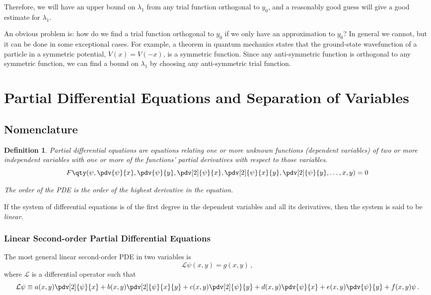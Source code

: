 \documentclass{article}
\theoremstyle{plain}\theoremheaderfont{\normalfont\itshape}\theorembodyfont{\rmfamily}\theoremseparator{.}\newtheorem*{rem}{Remark}\newtheorem*{ex}{Example}\newtheorem*{proof}{Proof}\newtheorem*{altp}{Alternative proof}
\theoremstyle{plain}\theoremheaderfont{\normalfont\bfseries}\theorembodyfont{\rmfamily}\theoremseparator{.}\newtheorem{thm}{Theorem}[section]\newtheorem{lem}[thm]{Lemma}\newtheorem{prop}[thm]{Proposition}\newtheorem*{cor}{Corollary}\newtheorem{defn}[thm]{Definition}\newtheorem{clm}[thm]{Claim}\newtheorem{clminproof}{Claim}
\theoremstyle{break}\theoremheaderfont{\normalfont\itshape}\theorembodyfont{\rmfamily}\theoremseparator{.\medskip}\newtheorem*{proofskip}{Proof}\newtheorem*{exs}{Examples}\newtheorem*{rems}{Remarks}
\theoremstyle{break}\theoremheaderfont{\normalfont\bfseries}\theorembodyfont{\rmfamily}\theoremseparator{.\medskip}\newtheorem{lemskip}[thm]{Lemma}\newtheorem{defnskip}[thm]{Definition}\newtheorem{propskip}[thm]{Proposition}\newtheorem{thmskip}[thm]{Theorem}
\numberwithin{equation}{section}
\begin{document}
	Therefore, we will have an upper bound on \(\lambda_1\) from any trial function orthogonal to \(y_0\), and a reasonably good guess will give a good estimate for \(\lambda_1\).

	An obvious problem is: how do we find a trial function orthogonal to \(y_0\) if we only have an approximation to \(y_0\)? In general we cannot, but it can be done in some exceptional cases. For example, a theorem in quantum mechanics states that the ground-state wavefunction of a particle in a symmetric potential, \(V(x)=V(-x)\), is a symmetric function. Since any anti-symmetric function is orthogonal to any symmetric function, we can find a bound on \(\lambda_1\) by choosing any anti-symmetric trial function.
	\newpage

	\section{Partial Differential Equations and Separation of Variables}
	\subsection{Nomenclature}
	\begin{defn}
		\textit{Partial differential equations} are equations relating one or more unknown functions (dependent variables) of two or more independent variables with one or more of the functions' partial derivatives with respect to those variables.
		\[F\qty(\psi,\pdv{\psi}{x},\pdv{\psi}{y},\pdv[2]{\psi}{x},\pdv[2]{\psi}{x}{y},\pdv[2]{\psi}{y},\dots,x,y)=0\]
		
		The \textit{order} of the PDE is the order of the highest derivative in the equation.
	\end{defn}
	
	If the system of differential equations is of the first degree in the dependent variables and all its derivatives, then the system is said to be \textit{linear}.
	
	\subsubsection{Linear Second-order Partial Differential Equations}
	The most general linear second-order PDE in two variables is
	\[\mathcal{L}\psi(x,y)=g(x,y)\,,\]
	where \(\mathcal{L}\) is a differential operator such that
	\[\mathcal{L}\psi\equiv a(x,y)\pdv[2]{\psi}{x}+b(x,y)\pdv[2]{\psi}{x}{y}+c(x,y)\pdv[2]{\psi}{y}+d(x,y)\pdv{\psi}{x}+e(x,y)\pdv{\psi}{y}+f(x,y)\psi\,.\]
	
\end{document}
